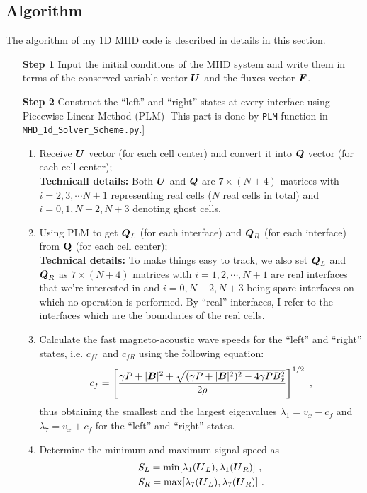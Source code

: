 \documentclass[10.5pt]{article}
\begin{document}
\subsection{Algorithm}
The algorithm of my 1D MHD code is described in details in this section.
\begin{enumerate}
	\item [\textbf{Step 1}] Input the initial conditions of the MHD system and write them in 
	terms of the conserved variable vector $\vb*{U}$ and the fluxes vector $\vb*{F}$.

	\item [\textbf{Step 2}] Construct the ``left'' and ``right'' states at every interface using 
	Piecewise Linear Method (PLM) [This part is done by \texttt{PLM} function in 
	\texttt{MHD\_1d\_Solver\_Scheme.py}.]
	\begin{enumerate}
		\item Receive $\vb*{U}$ vector (for each cell center) and 
		convert it into $\vb*{Q}$ vector (for each cell center);\\
		\textbf{Technicall details:}  Both $\vb*{U}$ and $\vb*{Q}$ are $7\times (N+4)$ 
		matrices with
	 	$i=2,3,\cdots N+1$ representing real cells ($N$ real cells in total) 
	 	and $i=0,1,N+2,N+3$ denoting ghost cells.
		\item Using PLM to get $\vb*{Q}_L$ (for each interface) and $\vb*{Q}_R$ 
		(for each interface) from $\vb{Q}$ (for each cell center);\\
	 	\textbf{Technical details:} To make things easy to track, we also set $\vb*{Q}_L$ and 
	 	$\vb*{Q}_R$ as $7\times (N+4)$ matrices with $i=1,2,\cdots,N+1$ are real interfaces 
	 	that we're interested in and $i=0,N+2,N+3$ being spare interfaces on 
		which no operation is performed. 
		By ``real'' interfaces, I refer to the interfaces which are the boundaries 
	of the real cells.
		\item Calculate the fast magneto-acoustic wave speeds for the ``left'' and ``right'' states,
		 i.e. $c_{fL}$ and $c_{fR}$ using the following equation:
			\begin{align}
				c_f = \left[\frac{\gamma P + |\vb*{B}|^2 + \sqrt{(\gamma P + |\vb*{B}|^2)^2 - 
				4\gamma P B_x^2}}{2\rho}\right]^{1/2} \ ,
			\end{align}
		thus obtaining the smallest and the largest eigenvalues $\lambda_1 = v_x - c_f$ and 
		$\lambda_7 = v_x + c_f$ for the ``left'' and ``right'' states.
		\item Determine the minimum and maximum signal speed as 
			\begin{align}
				&S_L = \min[\lambda_1(\vb*{U}_L),\lambda_1({\vb*{U}_R})] \ , \\
				&S_R = \max[\lambda_7(\vb*{U}_L),\lambda_7({\vb*{U}_R})] \ .
			\end{align}
	\end{enumerate}
	

\end{enumerate}
\end{document}
